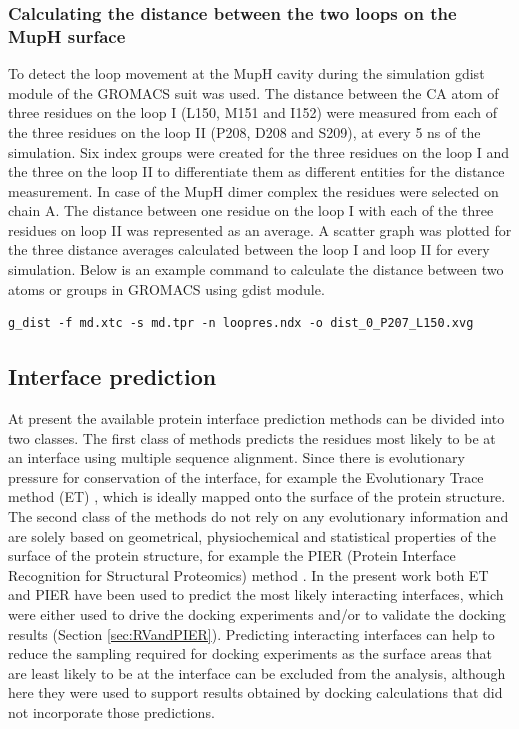 			\subsubsection{Calculating the distance between the two loops on the MupH surface}
			\label{sec:distLoops}
			To detect the loop movement at the MupH cavity during the simulation g\textunderscore dist module of the GROMACS suit was used. The distance between the CA atom of three residues on the loop I (L150, M151 and I152) were measured from each of the three residues on the loop II (P208, D208 and S209), at every 5 ns of the simulation. Six index groups were created for the three residues on the loop I and the three on the loop II to differentiate them as different entities for the distance measurement. In case of the MupH dimer complex the residues were selected on chain A. The distance between one residue on the loop I with each of the three residues on loop II was represented as an average. A scatter graph was plotted for the three distance averages calculated between the loop I and loop II for every simulation. Below is an example command to calculate the distance between two atoms or groups in GROMACS using g\textunderscore dist module.
			
\begin{lstlisting}
g_dist -f md.xtc -s md.tpr -n loopres.ndx -o dist_0_P207_L150.xvg
\end{lstlisting}			
			
		\subsection{Interface prediction}
		\label{sec:InterfacePrediction}
		At present the available protein interface prediction methods can be divided into two classes. The first class of methods predicts the residues most likely to be at an interface using multiple sequence alignment. Since there is  evolutionary pressure for conservation of the interface, for example the Evolutionary Trace method (ET) \parencite{Lichtarge1996}, which is ideally mapped onto the surface of the protein structure. The second class of the methods do not rely on any evolutionary information and are solely based on geometrical, physiochemical and statistical properties of the surface of the protein structure, for example the PIER (Protein Interface Recognition for Structural Proteomics) method \parencite{Kufareva2007}. In the present work both ET and PIER have been used to predict the most likely interacting interfaces, which were either used to drive the docking experiments and/or to validate the docking results (Section \ref{sec:RVandPIER}). Predicting interacting interfaces can help to reduce the sampling required for docking experiments as the surface areas that are least likely to be at the interface can be excluded from the analysis, although here they were used to support results obtained by docking calculations that did not incorporate those predictions. 
		

